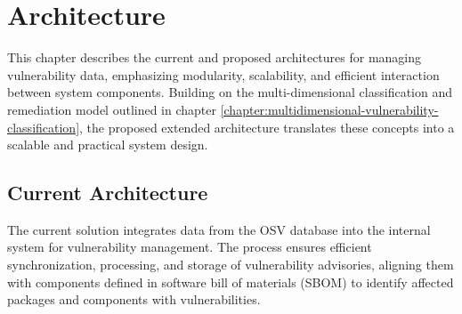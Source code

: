 \chapter{Architecture}
\label{chapter:architecture}

This chapter describes the current and proposed architectures for managing vulnerability data, emphasizing modularity, scalability, and efficient interaction between system components. Building on the multi-dimensional classification and remediation model outlined in chapter \ref{chapter:multidimensional-vulnerability-classification}, the proposed extended architecture translates these concepts into a scalable and practical system design.

\section{Current Architecture}
\label{sec:current-architecture}

The current solution integrates data from the \ac{OSV} database into the internal system for vulnerability management. The process ensures efficient synchronization, processing, and storage of vulnerability advisories, aligning them with components defined in software bill of materials (\ac{SBOM}) to identify affected packages and components with vulnerabilities.


